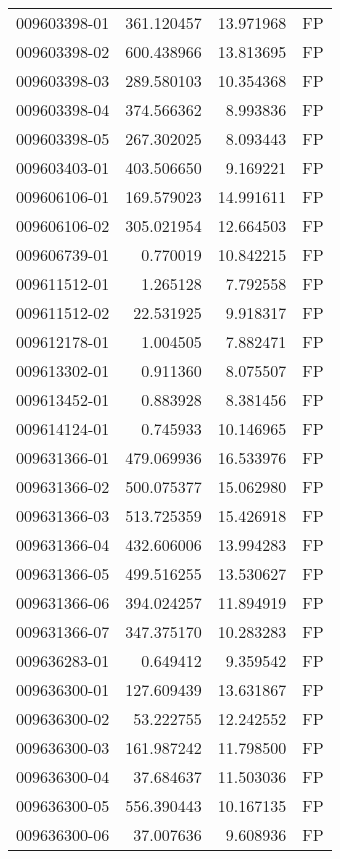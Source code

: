 \begin{tabular}{lrrl}
009603398-01 &  361.120457 &    13.971968 &   FP \\
009603398-02 &  600.438966 &    13.813695 &   FP \\
009603398-03 &  289.580103 &    10.354368 &   FP \\
009603398-04 &  374.566362 &     8.993836 &   FP \\
009603398-05 &  267.302025 &     8.093443 &   FP \\
009603403-01 &  403.506650 &     9.169221 &   FP \\
009606106-01 &  169.579023 &    14.991611 &   FP \\
009606106-02 &  305.021954 &    12.664503 &   FP \\
009606739-01 &    0.770019 &    10.842215 &   FP \\
009611512-01 &    1.265128 &     7.792558 &   FP \\
009611512-02 &   22.531925 &     9.918317 &   FP \\
009612178-01 &    1.004505 &     7.882471 &   FP \\
009613302-01 &    0.911360 &     8.075507 &   FP \\
009613452-01 &    0.883928 &     8.381456 &   FP \\
009614124-01 &    0.745933 &    10.146965 &   FP \\
009631366-01 &  479.069936 &    16.533976 &   FP \\
009631366-02 &  500.075377 &    15.062980 &   FP \\
009631366-03 &  513.725359 &    15.426918 &   FP \\
009631366-04 &  432.606006 &    13.994283 &   FP \\
009631366-05 &  499.516255 &    13.530627 &   FP \\
009631366-06 &  394.024257 &    11.894919 &   FP \\
009631366-07 &  347.375170 &    10.283283 &   FP \\
009636283-01 &    0.649412 &     9.359542 &   FP \\
009636300-01 &  127.609439 &    13.631867 &   FP \\
009636300-02 &   53.222755 &    12.242552 &   FP \\
009636300-03 &  161.987242 &    11.798500 &   FP \\
009636300-04 &   37.684637 &    11.503036 &   FP \\
009636300-05 &  556.390443 &    10.167135 &   FP \\
009636300-06 &   37.007636 &     9.608936 &   FP \\

\end{tabular}
